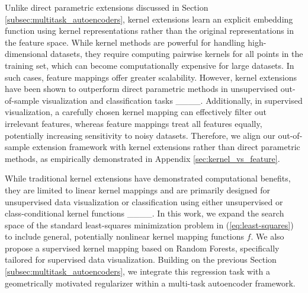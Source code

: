Unlike direct parametric extensions discussed in Section \ref{subsec:multitask_autoencoders}, kernel extensions learn an explicit embedding function using kernel representations rather than the original representations in the feature space. While kernel methods are powerful for handling high-dimensional datasets, they require computing pairwise kernels for all points in the training set, which can become computationally expensive for large datasets. In such cases, feature mappings offer greater scalability. However, kernel extensions have been shown to outperform direct parametric methods in unsupervised out-of-sample visualization and classification tasks ____. Additionally, in supervised visualization, a carefully chosen kernel mapping can effectively filter out irrelevant features, whereas feature mappings treat all features equally, potentially increasing sensitivity to noisy datasets. Therefore, we align our out-of-sample extension framework with kernel extensions rather than direct parametric methods, as empirically demonstrated in Appendix \ref{sec:kernel_vs_feature}.


While traditional kernel extensions have demonstrated computational benefits, they are limited to linear kernel mappings and are primarily designed for unsupervised data visualization or classification using either unsupervised or class-conditional kernel functions ____. In this work, we expand the search space of the standard least-squares minimization problem in (\ref{eq:least-squares}) to include general, potentially nonlinear kernel mapping functions \(f\). We also propose a supervised kernel mapping based on Random Forests, specifically tailored for supervised data visualization. Building on the previous Section \ref{subsec:multitask_autoencoders}, we integrate this regression task with a geometrically motivated regularizer within a multi-task autoencoder framework.